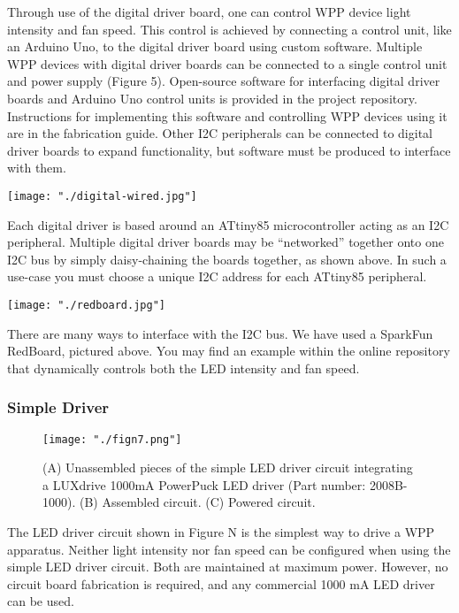 \documentclass[11pt]{article}
\begin{document}
Through use of the digital driver board, one can control WPP device light intensity and fan speed.
This control is achieved by connecting a control unit, like an Arduino Uno, to the digital driver board using custom software.
Multiple WPP devices with digital driver boards can be connected to a single control unit and power supply (Figure 5).
Open-source software for interfacing digital driver boards and Arduino Uno control units is provided in the project repository.
Instructions for implementing this software and controlling WPP devices using it are in the fabrication guide.
Other I2C peripherals can be connected to digital driver boards to expand functionality, but software must be produced to interface with them.

\begin{center}
  \texttt{[image: "./digital-wired.jpg"]}
\end{center}

Each digital driver is based around an ATtiny85 microcontroller acting as an I2C peripheral.
Multiple digital driver boards may be ``networked'' together onto one I2C bus by simply daisy-chaining the boards together, as shown above.
In such a use-case you must choose a unique I2C address for each ATtiny85 peripheral.

\begin{center}
  \texttt{[image: "./redboard.jpg"]}
\end{center}

There are many ways to interface with the I2C bus.
We have used a SparkFun RedBoard, pictured above.
You may find an example within the online repository that dynamically controls both the LED intensity and fan speed.



\subsubsection{Simple Driver} \label{SEC:simple-driver}

\begin{figure}[H]
	\centering
	\texttt{[image: "./fign7.png"]}
	\caption{(A) Unassembled pieces of the simple LED driver circuit integrating a LUXdrive 1000mA PowerPuck LED driver (Part number: 2008B-1000). (B) Assembled circuit. (C) Powered circuit.}
\end{figure}

The LED driver circuit shown in Figure N is the simplest way to drive a WPP apparatus.
Neither light intensity nor fan speed can be configured when using the simple LED driver circuit.
Both are maintained at maximum power.
However, no circuit board fabrication is required, and any commercial 1000 mA LED driver can be used.
\end{document}
